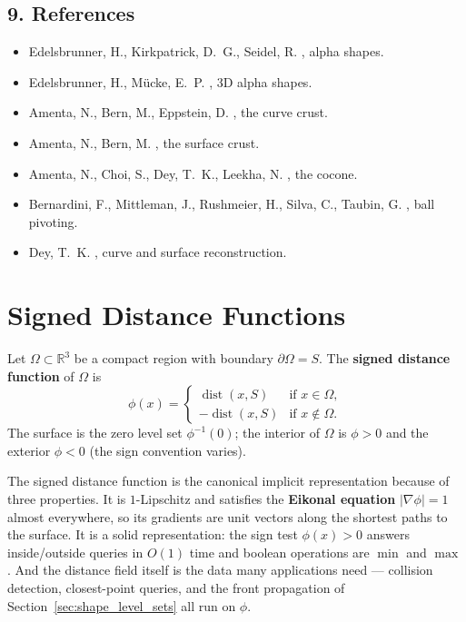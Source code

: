 \subsection{9. References}

\begin{itemize}
  \item Edelsbrunner, H., Kirkpatrick, D.~G., Seidel, R. \cite{edelsbrunner1983alpha},
    alpha shapes.
  \item Edelsbrunner, H., M\"ucke, E.~P. \cite{edelsbrunner1994}, 3D alpha shapes.
  \item Amenta, N., Bern, M., Eppstein, D. \cite{amenta1998}, the curve crust.
  \item Amenta, N., Bern, M. \cite{amentabern1999}, the surface crust.
  \item Amenta, N., Choi, S., Dey, T.~K., Leekha, N. \cite{amenta2000}, the cocone.
  \item Bernardini, F., Mittleman, J., Rushmeier, H., Silva, C., Taubin, G.
    \cite{bernardini1999}, ball pivoting.
  \item Dey, T.~K. \cite{dey2007}, curve and surface reconstruction.
\end{itemize}


\section{Signed Distance Functions}
\label{sec:shape_sdf}

\begin{definition}\label{def:shape_sdf}
  Let $\Omega \subset \mathbb{R}^3$ be a compact region with boundary
  $\partial\Omega = S$. The \textbf{signed distance function} of $\Omega$ is
  \[
  \phi(x) = \begin{cases} \operatorname{dist}(x, S) & \text{if } x \in \Omega, \\
                         -\operatorname{dist}(x, S) & \text{if } x \notin \Omega. \end{cases}
  \]
  The surface is the zero level set $\phi^{-1}(0)$; the interior of $\Omega$
  is $\phi > 0$ and the exterior $\phi < 0$ (the sign convention varies).
\end{definition}

The signed distance function is the canonical
implicit representation because of three properties. It is $1$-Lipschitz and
satisfies the \textbf{Eikonal equation}
$|\nabla \phi| = 1$ almost everywhere, so its gradients are unit vectors along
the shortest paths to the surface. It is a solid representation: the sign test
$\phi(x) > 0$ answers inside/outside queries in $O(1)$ time and boolean
operations are $\min$ and $\max$. And the distance field itself is the data
many applications need --- collision detection, closest-point queries, and the
front propagation of Section~\ref{sec:shape_level_sets} all run on $\phi$.

